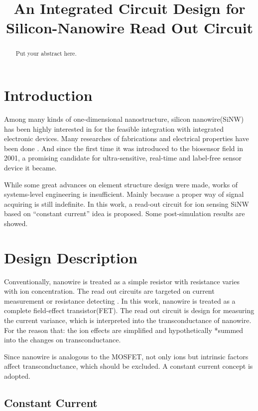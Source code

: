\documentclass{article}
\title{An Integrated Circuit Design for Silicon-Nanowire Read Out Circuit}
\begin{document}
%
\maketitle
%
\begin{abstract}
Put your abstract here.

\end{abstract}
%
\section{Introduction}
\label{sec:intro}

Among many kinds of one-dimensional nanostructure, silicon nanowire(SiNW) has been highly interested in for the feasible integration with integrated electronic devices.
Many researches of fabrications and electrical properties have been done \cite{J1}.
And since the first time it was introduced to the biosensor field in 2001\cite{J2}, a promising candidate for ultra-sensitive, real-time and label-free  sensor device it became.

While some great advances on element structure design were made\cite{J3}, works of systems-level engineering is insufficient.
Mainly because a proper way of signal acquiring is still indefinite.
In this work, a read-out circuit for ion sensing SiNW based on “constant current” idea is proposed.
Some post-simulation results are showed.



\section{Design Description}
\label{sec:rules}

Conventionally, nanowire is treated as a simple resistor with resistance varies with ion concentration.
The read out circuits are targeted on current measurement \cite{J4} or resistance detecting \cite{J5, j6}.
In this work, nanowire is treated as a complete field-effect transistor(FET).
The read out circuit is design for measuring the current variance, which is interpreted into the transconductance of nanowire.
For the reason that: the ion effects are simplified and hypothetically *summed into the changes on transconductance.

Since nanowire is analogous to the MOSFET, not only ions but intrinsic factors affect transconductance, which should be excluded.
A constant current concept is adopted.

\subsection{Constant Current}
\end{document}
